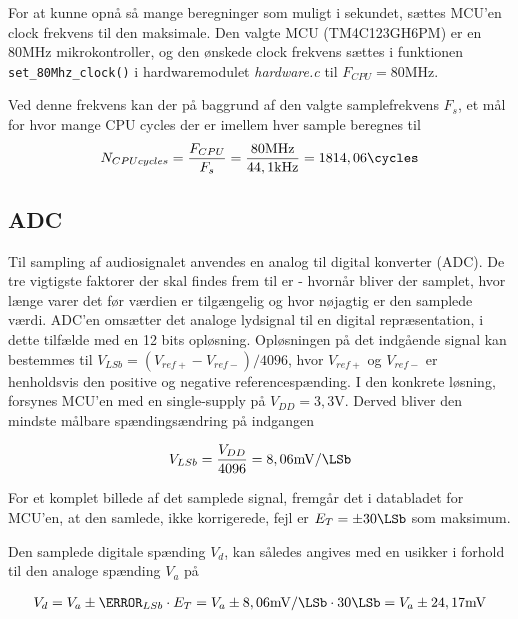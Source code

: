 For at kunne opnå så mange beregninger som muligt i sekundet, sættes MCU'en clock frekvens til den maksimale.
Den valgte MCU (TM4C123GH6PM) er en $80\si{\mega\hertz}$ mikrokontroller, og den ønskede clock frekvens sættes i funktionen \texttt{set\_80Mhz\_clock()} i hardwaremodulet \textit{hardware.c} til $F_{CPU} = 80\si{\mega\hertz}$. 

Ved denne frekvens kan der på baggrund af den valgte samplefrekvens $F_s$, et mål for hvor mange CPU cycles der er imellem hver sample beregnes til
\begin{align}
N_{CPU cycles} = \frac{F_{CPU}}{F_s}  =  \frac{80\si{\mega\hertz}}{44,1\si{\kilo\hertz}}  = 1814,06 \si{\cycles}
\end{align}

\subsection{ADC}
Til sampling af audiosignalet anvendes en analog til digital konverter (ADC). 
De tre vigtigste faktorer der skal findes frem til er - hvornår bliver der samplet, hvor længe varer det før værdien er tilgængelig og hvor nøjagtig er den samplede værdi.
ADC'en omsætter det analoge lydsignal til en digital repræsentation, i dette tilfælde med en 12 bits opløsning.
Opløsningen på det indgående signal kan bestemmes til $V_{LSb} = (V_{ref+} - V_{ref-} ) / 4096 $, hvor $V_{ref+}$ og $V_{ref-}$ er henholdsvis den positive og negative referencespænding.
I den konkrete løsning, forsynes MCU'en med en single-supply på $V_{DD} = 3,3\si{\volt}$.
Derved bliver den mindste målbare spændingsændring på indgangen

\begin{align}
V_{LSb} = \frac{V_{DD}}{4096} = 8,06\si{\milli\volt\per\LSb}
\end{align}

For et komplet billede af det samplede signal, fremgår det i databladet \cite[afsnit 24.14 s. 1383]{tm4c123gh6pm} for MCU'en, at
den samlede, ikke korrigerede, fejl er $E_T = \pm 30\si{\LSb}$ som maksimum.

Den samplede digitale spænding $V_{d}$, kan således angives med en usikker i forhold til den analoge spænding $V_{a}$ på

\begin{align}
V_{d} = V_{a} \pm \V_{LSb} \cdot E_T = V_{a} \pm   8,06\si{\milli\volt\per\LSb} \cdot 30 \si{\LSb} = V_{a} \pm 24,17\si{\milli\volt}
\end{align} 

